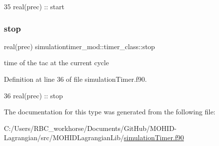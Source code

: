 \begin{DoxyCode}
35         \textcolor{keywordtype}{real(prec)} :: start
\end{DoxyCode}
\mbox{\label{structsimulationtimer__mod_1_1timer__class_a96b9fcb1a8e2ae20422e274a025b290d}} 
\subsubsection{\texorpdfstring{stop}{stop}}
{\footnotesize\ttfamily real(prec) simulationtimer\+\_\+mod\+::timer\+\_\+class\+::stop\hspace{0.3cm}{\ttfamily [private]}}



time of the tac at the current cycle 



Definition at line 36 of file simulation\+Timer.\+f90.


\begin{DoxyCode}
36         \textcolor{keywordtype}{real(prec)} :: stop
\end{DoxyCode}


The documentation for this type was generated from the following file\+:\begin{DoxyCompactItemize}
\item 
C\+:/\+Users/\+R\+B\+C\+\_\+workhorse/\+Documents/\+Git\+Hub/\+M\+O\+H\+I\+D-\/\+Lagrangian/src/\+M\+O\+H\+I\+D\+Lagrangian\+Lib/\mbox{\hyperlink{simulation_timer_8f90}{simulation\+Timer.\+f90}}\end{DoxyCompactItemize}
